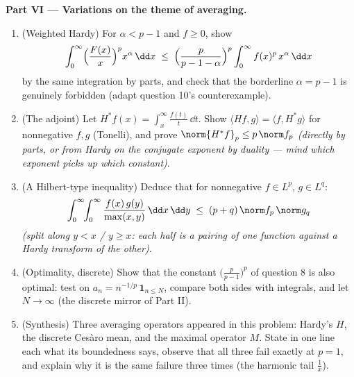 \begin{problem}
\medskip
\noindent\textbf{Part VI --- Variations on the theme of
averaging.}
\begin{enumerate}[resume]
  \item (Weighted Hardy) For $\alpha < p - 1$ and $f \geq 0$,
        show
        \[
        \int_0^\infty\Bigl(\frac{F(x)}x\Bigr)^{p}
        x^{\alpha}\,\dd x \;\leq\;
        \Bigl(\frac{p}{p - 1 - \alpha}\Bigr)^{p}
        \int_0^\infty f(x)^p\,x^{\alpha}\,\dd x
        \]
        by the same integration by parts, and check that the
        borderline $\alpha = p - 1$ is genuinely forbidden
        (adapt question 10's counterexample).
  \item (The adjoint) Let $H^*f(x) =
        \int_x^{\infty}\frac{f(t)}t\,\dd t$. Show $\langle
        Hf, g\rangle = \langle f, H^*g\rangle$ for
        nonnegative $f, g$ (Tonelli), and prove
        $\norm{H^*f}_p \leq p\,\norm f_p$ \emph{(directly by
        parts, or from Hardy on the conjugate exponent by
        duality --- mind which exponent picks up which
        constant)}.
  \item (A Hilbert-type inequality) Deduce that for
        nonnegative $f \in L^p$, $g \in L^q$:
        \[
        \int_0^\infty\!\!\int_0^\infty
        \frac{f(x)\,g(y)}{\max(x,y)}\,\dd x\,\dd y
        \;\leq\; (p + q)\,\norm f_p\,\norm g_q
        \]
        \emph{(split along $y < x$ / $y \geq x$: each half is
        a pairing of one function against a Hardy transform
        of the other)}.
  \item (Optimality, discrete) Show that the constant
        $\bigl(\frac p{p-1}\bigr)^p$ of question 8 is also
        optimal: test on $a_n = n^{-1/p}\,\mathbf 1_{n \leq
        N}$, compare both sides with integrals, and let $N
        \to \infty$ (the discrete mirror of Part II).
  \item (Synthesis) Three averaging operators appeared in
        this problem: Hardy's $H$, the discrete Ces\`aro
        mean, and the maximal operator $M$. State in one
        line each what its boundedness says, observe that all
        three fail exactly at $p = 1$, and explain why it is
        the same failure three times (the harmonic tail
        $\frac1x$).
\end{enumerate}


\end{problem}
